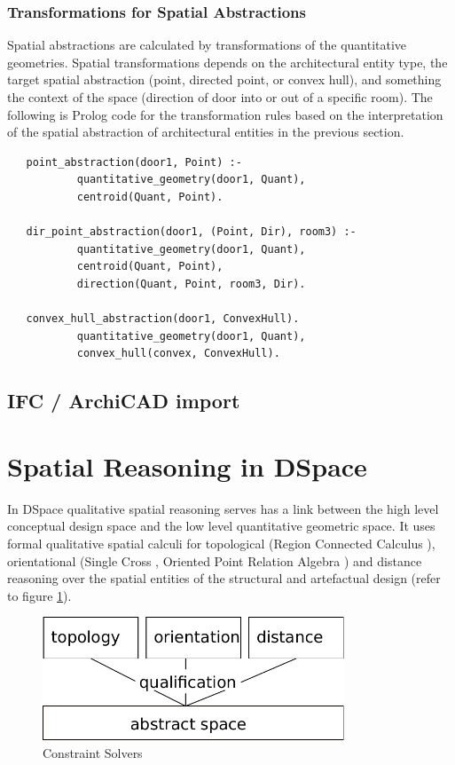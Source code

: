 \documentclass[12pt]{ucthesis}
\begin{document}
\subsubsection{Transformations for Spatial Abstractions}
Spatial abstractions are calculated by transformations of the quantitative geometries. Spatial transformations depends on the architectural entity type, the target spatial abstraction (point, directed point, or convex hull), and something the context of the space (direction of door into or out of a specific room). The following is Prolog code for the transformation rules based on the interpretation of the spatial abstraction of architectural entities in the previous section.
\begin{verbatim}
   point_abstraction(door1, Point) :-
           quantitative_geometry(door1, Quant),
           centroid(Quant, Point).
            
   dir_point_abstraction(door1, (Point, Dir), room3) :-
           quantitative_geometry(door1, Quant),
           centroid(Quant, Point),
           direction(Quant, Point, room3, Dir).   
   
   convex_hull_abstraction(door1, ConvexHull).
           quantitative_geometry(door1, Quant),
           convex_hull(convex, ConvexHull).
\end{verbatim}

\subsection{IFC / ArchiCAD import}


\section{Spatial Reasoning in DSpace}
In DSpace qualitative spatial reasoning serves has a link between the high level conceptual design space and the low level quantitative geometric space. It uses formal qualitative spatial calculi for topological (Region Connected Calculus \cite{Freksa}), orientational (Single Cross \cite{Freksa}, Oriented Point Relation Algebra \cite{Moratz}) and distance reasoning over the spatial entities of the structural and artefactual design (refer to figure \ref{reasoner-design}). 

\begin{figure}[H]
\centering
\includegraphics[width=90mm]{reasoner-design}
\caption{Constraint Solvers}
\label{reasoner-design}
\end{figure}
\end{document}
